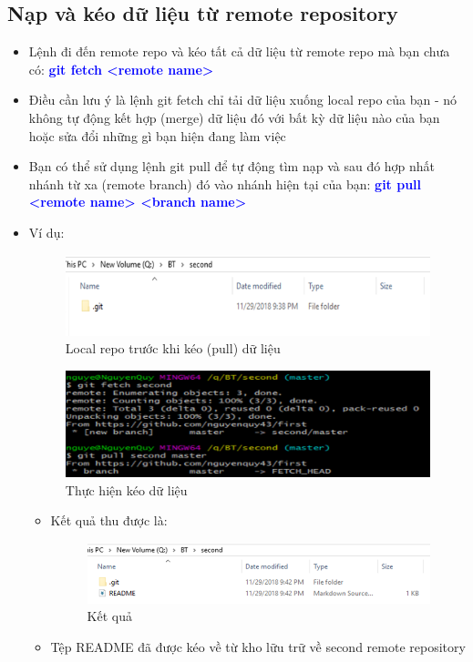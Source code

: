 \documentclass[12pt,a4paper]{report}
\begin{document}
\subsection{Nạp và kéo dữ liệu từ remote repository} 
\begin{itemize}
\item Lệnh đi đến remote repo và kéo tất cả dữ liệu từ remote repo mà bạn chưa có: \textcolor{blue}{\bf git fetch <remote name>}
\item Điều cần lưu ý là lệnh git fetch chỉ tải dữ liệu xuống  local repo của bạn - nó không tự động kết hợp (merge) dữ liệu đó với bất kỳ dữ liệu nào của bạn hoặc sửa đổi những gì bạn hiện đang làm việc
\item Bạn có thể sử dụng lệnh git pull để tự động tìm nạp và sau đó hợp nhất nhánh từ xa (remote branch) đó vào nhánh hiện tại của bạn: \textcolor{blue}{\bf git pull <remote name> <branch name>}
\item Ví dụ: 
	
	\begin{figure}[!ht]
	\centering
	\includegraphics[width=0.8\linewidth]{screenshot035}
\caption{Local repo trước khi kéo (pull) dữ liệu}
	\label{fig:screenshot035}
	\end{figure}

\begin{figure}[!ht]
	\centering	
	\includegraphics[width=0.8\linewidth]{screenshot036}
\caption{Thực hiện kéo dữ liệu}
	\label{fig:screenshot036}
\end{figure}

\begin{itemize}
\item Kết quả thu được là: 

\begin{figure}[!ht]
	\centering
	\includegraphics[width=0.8\linewidth]{screenshot037}
\caption{Kết quả}
	\label{fig:screenshot037}
\end{figure}

\item Tệp README đã được kéo về từ kho lữu trữ về second remote repository
\end{itemize}
\end{itemize}
\end{document}
